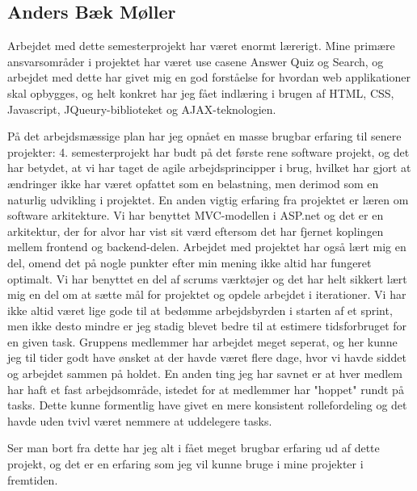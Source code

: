 \subsection*{Anders Bæk Møller}


Arbejdet med dette semesterprojekt har været enormt lærerigt. Mine primære ansvarsområder i projektet har været use casene Answer Quiz og Search, og arbejdet med dette har givet mig en god forståelse for hvordan web applikationer skal opbygges, og helt konkret har jeg fået indlæring i brugen af HTML, CSS, Javascript, JQueury-biblioteket og AJAX-teknologien. 

På det arbejdsmæssige plan har jeg opnået en masse brugbar erfaring til senere projekter: 4. semesterprojekt har budt på det første rene software projekt, og det har betydet, at vi har taget de agile arbejdsprincipper i brug, hvilket har gjort at ændringer ikke har været opfattet som en belastning, men derimod som en naturlig udvikling i projektet. En anden vigtig erfaring fra projektet er læren om software arkitekture. Vi har benyttet MVC-modellen i ASP.net og det er en arkitektur, der for alvor har vist sit værd eftersom det har fjernet koplingen mellem frontend og backend-delen.
Arbejdet med projektet har også lært mig en del, omend det på nogle punkter efter min mening ikke altid har fungeret optimalt. Vi har benyttet en del af scrums værktøjer og det har helt sikkert lært mig en del om at sætte mål for projektet og opdele arbejdet i iterationer. Vi har ikke altid været lige gode til at bedømme arbejdsbyrden i starten af et sprint, men ikke desto mindre er jeg stadig blevet bedre til at estimere tidsforbruget for en given task. Gruppens medlemmer har arbejdet meget seperat, og her kunne jeg til tider godt have ønsket at der havde været flere dage, hvor vi havde siddet og arbejdet sammen på holdet. En anden ting jeg har savnet er at hver medlem har haft et fast arbejdsområde, istedet for at medlemmer har "hoppet" rundt på tasks. Dette kunne formentlig have givet en mere konsistent rollefordeling og det havde uden tvivl været nemmere at uddelegere tasks. 
 
Ser man bort fra dette har jeg alt i fået meget brugbar erfaring ud af dette projekt, og det er en erfaring som jeg vil kunne bruge i mine projekter i fremtiden.
